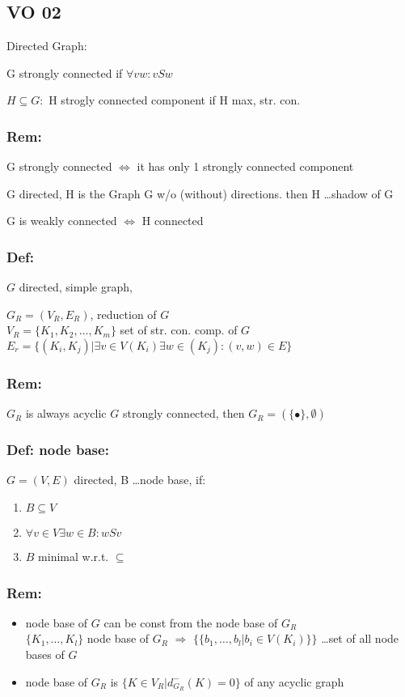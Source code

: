 \subsection{VO 02}

Directed Graph:

G strongly connected if $\forall vw : vSw$

$H \subseteq G: $ H strogly connected component if H max, str. con.

\subsubsection*{Rem:}
G strongly connected $\iff$ it has only 1 strongly connected component

G directed, H is the Graph G w/o (without) directions. then 
H \ldots shadow of G

G is weakly connected $\iff$ H connected

\subsubsection*{Def:}
$G$ directed, simple graph, 


$G_R = (V_R, E_R)$, reduction of $G$ \\
$V_R = \{K_1, K_2, \ldots , K_m\}$ set of str. con. comp. of $G$ \\
$E_r = \{ (K_i, K_j) | \exists v \in V(K_i) \exists w \in (K_j) : (v,w) \in E \}$

\subsubsection*{Rem:}
$G_R$ is always acyclic
$G$ strongly connected, then $G_R = ( \{ \bullet \}, \emptyset )$

\subsubsection*{Def: node base:}
$G=(V,E) $ directed, B \ldots node base, if:
\begin{enumerate}
\item $B \subseteq V$ 
\item $\forall v \in V \exists w \in B : wSv$
\item $B$ minimal w.r.t. $\subseteq$
\end{enumerate}

\subsubsection*{Rem: }
\begin{itemize}
\item node base of $G$ can be const from the node base of $G_R$ \\
	$\{K_1, \ldots , K_l\} $ node base of $G_R$ $\Rightarrow$ 
	$\{\{b_1, \ldots , b_l | b_i \in V(K_i)\}\}$ \ldots set of all node bases of $G$

\item node base of $G_R$ is $\{K \in V_R | d_{G_R}^{-}(K) = 0 \}$ of any acyclic graph
\end{itemize}
